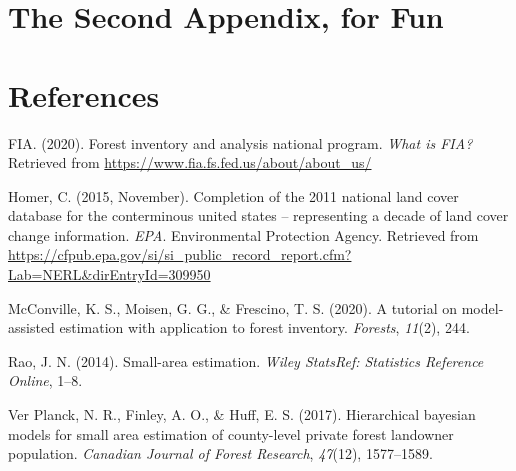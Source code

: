\documentclass[12pt,twoside]{reedthesis}
\begin{document}
\hypertarget{the-second-appendix-for-fun}{%
\chapter{The Second Appendix, for Fun}\label{the-second-appendix-for-fun}}

\backmatter

\hypertarget{references}{%
\chapter*{References}\label{references}}


\noindent

\setlength{\parindent}{-0.20in}
\setlength{\leftskip}{0.20in}
\setlength{\parskip}{8pt}

\hypertarget{refs}{}
\leavevmode\hypertarget{ref-whatisfia}{}%
FIA. (2020). Forest inventory and analysis national program. \emph{What is FIA?} Retrieved from \url{https://www.fia.fs.fed.us/about/about_us/}

\leavevmode\hypertarget{ref-nlcd11}{}%
Homer, C. (2015, November). Completion of the 2011 national land cover database for the conterminous united states -- representing a decade of land cover change information. \emph{EPA}. Environmental Protection Agency. Retrieved from \url{https://cfpub.epa.gov/si/si_public_record_report.cfm?Lab=NERL\&dirEntryId=309950}

\leavevmode\hypertarget{ref-mcconville2020}{}%
McConville, K. S., Moisen, G. G., \& Frescino, T. S. (2020). A tutorial on model-assisted estimation with application to forest inventory. \emph{Forests}, \emph{11}(2), 244.

\leavevmode\hypertarget{ref-rao2014}{}%
Rao, J. N. (2014). Small-area estimation. \emph{Wiley StatsRef: Statistics Reference Online}, 1--8.

\leavevmode\hypertarget{ref-ver2017}{}%
Ver Planck, N. R., Finley, A. O., \& Huff, E. S. (2017). Hierarchical bayesian models for small area estimation of county-level private forest landowner population. \emph{Canadian Journal of Forest Research}, \emph{47}(12), 1577--1589.


\end{document}
